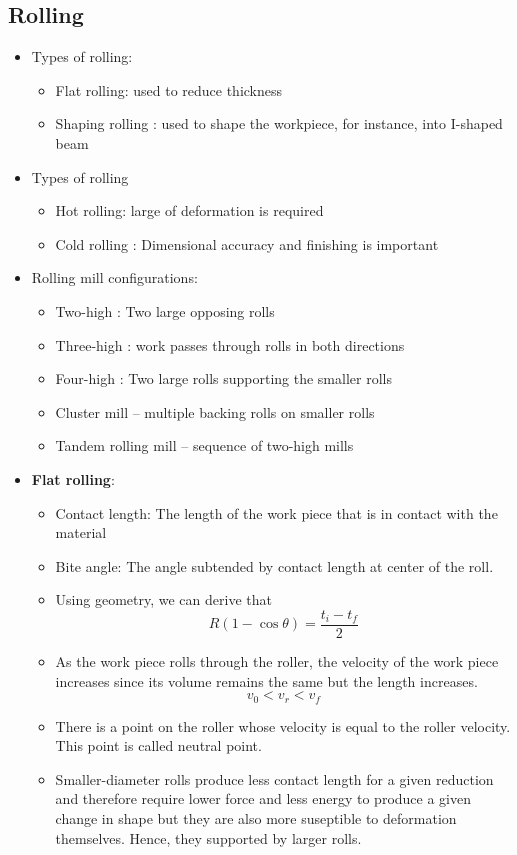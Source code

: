 \documentclass{article}
\begin{document}
		\subsection{Rolling}
		\begin{itemize}
			\item Types of rolling:
			\begin{itemize}
				\item Flat rolling: used to reduce thickness
				\item Shaping rolling : used to shape the workpiece, for instance, into I-shaped beam
			\end{itemize}

			\item Types of rolling
			\begin{itemize}
				\item Hot rolling: large of deformation is required
				\item Cold rolling : Dimensional accuracy and finishing is important
			\end{itemize}

			\item Rolling mill configurations:
			\begin{itemize}
				\item Two-high : Two large opposing rolls
				\item Three-high : work passes through rolls in both directions
				\item Four-high : Two large rolls supporting the smaller rolls
				\item Cluster mill – multiple backing rolls on smaller rolls
				\item Tandem rolling mill – sequence of two-high mills
			\end{itemize}

			\item \textbf{Flat rolling}:
			\begin{itemize}
				\item Contact length: The length of the work piece that is in contact with the material
				\item Bite angle: The angle subtended by contact length at center of the roll.
				\item Using geometry, we can derive that
				\[R(1-\cos\theta) = \frac{t_i - t_f}{2}\]
				\item As the work piece rolls through the roller, the velocity of the work piece increases since its volume remains the same but the length increases. 
				\[v_0<v_r<v_f\]
				\item There is a point on the roller whose velocity is equal to the roller velocity. This point is called neutral point.
				\item Smaller-diameter rolls produce less contact length for a given reduction and therefore require lower force and less energy to produce a given change in shape but they are also more suseptible to deformation themselves. Hence, they supported by larger rolls.
			\end{itemize}
			

\end{itemize}
\end{document}
